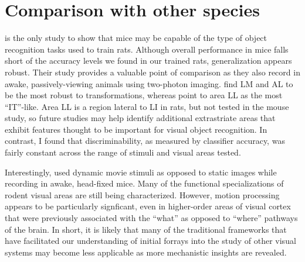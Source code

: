 \section{Comparison with other species}
\citet{Froudarakis2020} is the only study to show that mice may be capable of the type of object recognition tasks used to train rats. Although overall performance in mice falls short of the accuracy levels we found in our trained rats, generalization appears robust. Their study provides a valuable point of comparison as they also record in awake, passively-viewing animals using two-photon imaging. \citet{Froudarakis2020} find LM and AL to be the most robust to transformations, whereas \citet{Tafazoli2017} point to area LL as the most ``IT''-like. Area LL is a region lateral to LI in rats, but not tested in the mouse study, so future studies may help identify additional extrastriate areas that exhibit features thought to be important for visual object recognition.  In contrast, I found that discriminability, as measured by classifier accuracy, was fairly constant across the range of stimuli and visual areas tested. 

Interestingly, \citet{Froudarakis2020} used dynamic movie stimuli as opposed to static images while recording in awake, head-fixed mice. Many of the functional specializations of rodent visual areas are still being characterized. However, motion processing appears to be particularly signficant, even in higher-order areas of visual cortex that were previously associated with the ``what'' as opposed to ``where'' pathways of the brain. In short, it is likely that many of the traditional frameworks that have facilitated our understanding of initial forrays into the study of other visual systems may become less applicable as more mechanistic insights are revealed.


